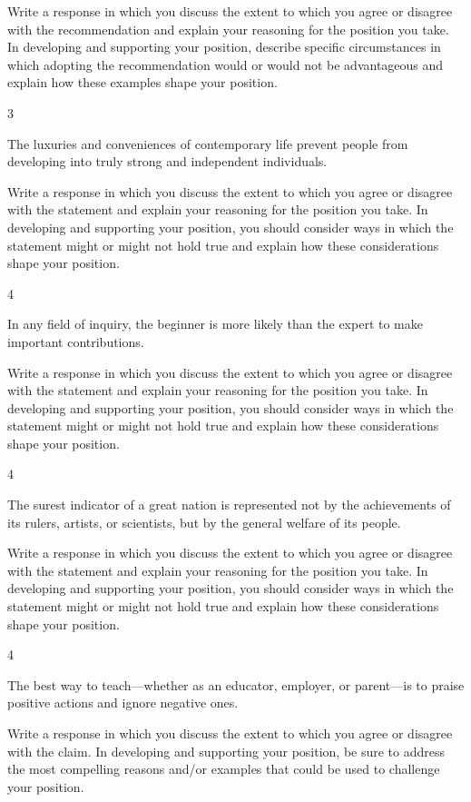 \documentclass[]{article}
\begin{document}
Write a response in which you discuss the extent to which you agree or
disagree with the recommendation and explain your reasoning for the
position you take. In developing and supporting your position, describe
specific circumstances in which adopting the recommendation would or
would not be advantageous and explain how these examples shape your
position.

3

The luxuries and conveniences of contemporary life prevent people from
developing into truly strong and independent individuals.

Write a response in which you discuss the extent to which you agree or
disagree with the statement and explain your reasoning for the position
you take. In developing and supporting your position, you should
consider ways in which the statement might or might not hold true and
explain how these considerations shape your position.

4

In any field of inquiry, the beginner is more likely than the expert to
make important contributions.

Write a response in which you discuss the extent to which you agree or
disagree with the statement and explain your reasoning for the position
you take. In developing and supporting your position, you should
consider ways in which the statement might or might not hold true and
explain how these considerations shape your position.

4

The surest indicator of a great nation is represented not by the
achievements of its rulers, artists, or scientists, but by the general
welfare of its people.

Write a response in which you discuss the extent to which you agree or
disagree with the statement and explain your reasoning for the position
you take. In developing and supporting your position, you should
consider ways in which the statement might or might not hold true and
explain how these considerations shape your position.

4

The best way to teach---whether as an educator, employer, or parent---is
to praise positive actions and ignore negative ones.

Write a response in which you discuss the extent to which you agree or
disagree with the claim. In developing and supporting your position, be
sure to address the most compelling reasons and/or examples that could
be used to challenge your position.
\end{document}
